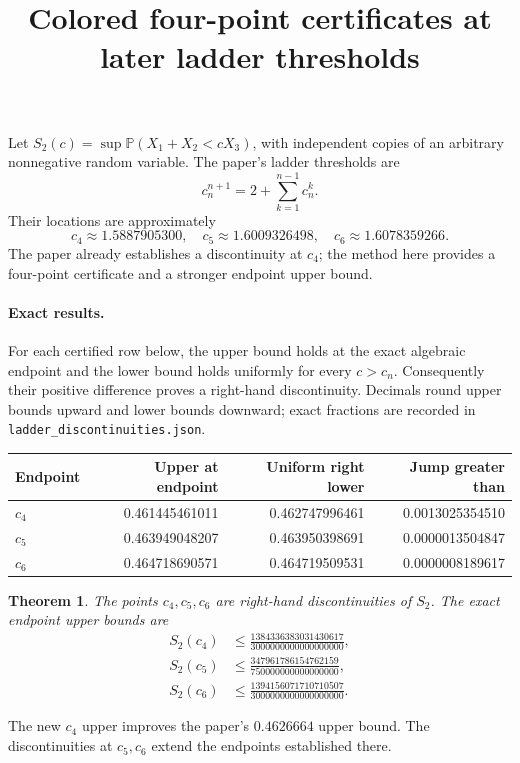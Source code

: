\documentclass[11pt]{article}
\newtheorem{theorem}{Theorem}
\begin{document}
\title{Colored four-point certificates at later ladder thresholds}
\author{}\date{}\maketitle

Let $S_2(c)=\sup\mathbb P(X_1+X_2<cX_3)$, with independent copies of
an arbitrary nonnegative random variable. The paper's ladder thresholds are
\[
c_n^{n+1}=2+\sum_{k=1}^{n-1}c_n^k.
\]
Their locations are approximately
\[
c_4\approx1.5887905300,\quad
c_5\approx1.6009326498,\quad
c_6\approx1.6078359266.
\]
The paper already establishes a discontinuity at $c_4$; the method here
provides a four-point certificate and a stronger endpoint upper bound.

\paragraph{Exact results.}
For each certified row below, the upper bound holds at the exact algebraic
endpoint and the lower bound holds uniformly for every $c>c_n$.
Consequently their positive difference proves a right-hand discontinuity.
Decimals round upper bounds upward and lower bounds downward; exact
fractions are recorded in \texttt{ladder\_discontinuities.json}.
\begin{center}
\begin{tabular}{lrrr}\toprule
Endpoint&Upper at endpoint&Uniform right lower&Jump greater than\\\midrule
$c_4$&0.461445461011&0.462747996461&0.0013025354510\\
$c_5$&0.463949048207&0.463950398691&0.0000013504847\\
$c_6$&0.464718690571&0.464719509531&0.0000008189617\\
\bottomrule\end{tabular}
\end{center}
\begin{theorem}
The points $c_4,c_5,c_6$ are right-hand discontinuities of $S_2$.
The exact endpoint upper bounds are
\[
\begin{aligned}
S_2(c_4)&\le\frac{1384336383031430617}{3000000000000000000},\\
S_2(c_5)&\le\frac{347961786154762159}{750000000000000000},\\
S_2(c_6)&\le\frac{1394156071710710507}{3000000000000000000}.
\end{aligned}
\]
\end{theorem}
The new $c_4$ upper improves the paper's $0.4626664$ upper bound.
The discontinuities at $c_5,c_6$ extend the endpoints established there.
\end{document}
